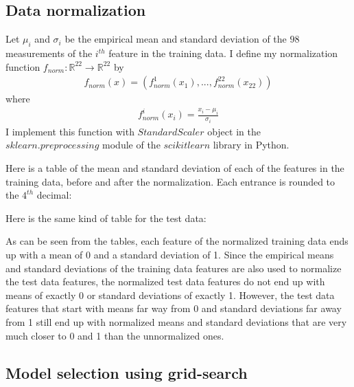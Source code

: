 \subsection{Data normalization}
Let $\mu_i$ and $\sigma_i$ be the empirical mean and standard deviation of the $98$ measurements of the $i^{th}$ feature in the training data. I define my normalization function $f_{norm}:\mathbb{R}^{22}\to \mathbb{R}^{22}$ by  
\begin{align}
f_{norm}(x) = \left(f^1_{norm}(x_1), ...,f^{22}_{norm}(x_{22})\right) 
\end{align}
where
\begin{align}
f^i_{norm}(x_i) = \frac{x_i - \mu_i}{\sigma_i}
\end{align}
I implement this function with $StandardScaler$ object in the $sklearn.preprocessing$ module of the $scikit learn$ library in Python.

Here is a table of the mean and standard deviation of each of the features in the training data, before and after the normalization. Each entrance is rounded to the $4^{th}$ decimal:
\begin{center}

\end{center}
\vspace{10pt}

Here is the same kind of table for the test data:

\begin{center}

\end{center}
\vspace{10pt}

As can be seen from the tables, each feature of the normalized training data ends up with a mean of 0 and a standard deviation of 1. Since the empirical means and standard deviations of the training data features are also used to normalize the test data features, the normalized test data features do not end up with means of exactly 0 or standard deviations of exactly 1. However, the test data features that start with means far way from 0 and standard deviations far away from 1 still end up with normalized means and standard deviations that are very much closer to 0 and 1 than the unnormalized ones.

\subsection{Model selection using grid-search}

